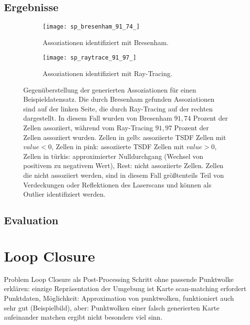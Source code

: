 \subsection{Ergebnisse}
\label{section:association_results}

\begin{figure}
	\centering
	\begin{subfigure}{.5\textwidth}
 		 \centering
  		 \texttt{[image: sp\_bresenham\_91\_74\_]}
  		 \centering \caption{Assoziationen identifiziert mit Bresenham.}
  		 \label{fig:sp_bresenham}
	\end{subfigure}%
	\begin{subfigure}{.5\textwidth}
    	\centering
  		\texttt{[image: sp\_raytrace\_91\_97\_]}
  		\centering \caption{Assoziationen identifiziert mit Ray-Tracing.}
  		\label{fig:sp_raytrace}
	\end{subfigure}
	\caption{Gegenüberstellung der generierten Assoziationen für einen Beispieldatensatz. Die durch Bresenham gefunden Assoziationen sind auf der linken Seite, die durch Ray-Tracing auf der rechten dargestellt. In diesem Fall wurden von Bresenham $91,74$ Prozent der Zellen assoziiert, während vom Ray-Tracing $91,97$ Prozent der Zellen assoziiert wurden. Zellen in gelb: assoziierte TSDF Zellen mit $value < 0$, Zellen in pink: assoziierte TSDF Zellen mit $value > 0$, Zellen in türkis: approximierter Nulldurchgang (Wechsel von positivem zu negativem Wert), Rest: nicht assoziierte Zellen. Zellen die nicht assoziiert werden, sind in diesem Fall größtenteils Teil von Verdeckungen oder Reflektionen des Laserscans und können als Outlier identifiziert werden.}
	\label{fig:bresenham_vs_raytrace}
\end{figure}

\subsection{Evaluation}
\label{section:association_evaluation}


\section{Loop Closure}

Problem Loop Closure als Post-Processing Schritt ohne passende Punktwolke erklären:
einzige Repräsentation der Umgebung ist Karte
scan-matching erfordert Punktdaten, Möglichkeit: Approximation von punktwolken, funktioniert auch sehr gut (Beispielbild), aber: Punktwolken einer falsch generierten Karte aufeinander matchen ergibt nicht besonders viel sinn.

